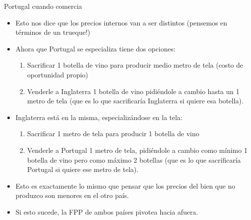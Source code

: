 \documentclass{beamer}
\begin{document}
\begin{frame}{Portugal cuando comercia}
    \begin{itemize}
        \item Esto nos dice que los precios internos van a ser distintos (pensemos en términos de un trueque!)
        \item Ahora que Portugal se especializa tiene dos opciones:
        \begin{enumerate}
            \item Sacrificar 1 botella de vino para producir medio metro de tela (costo de oportunidad propio)
            \item Venderle a Inglaterra 1 botella de vino pidiéndole a cambio hasta un 1 metro de tela (que es lo que sacrificaría Inglaterra si quiere esa botella).
        \end{enumerate}
        \item Inglaterra está en la misma, especializándose en la tela:
        \begin{enumerate}
            \item Sacrificar 1 metro de tela para producir 1 botella de vino
            \item Venderle a Portugal 1 metro de tela, pidiéndole a cambio como mínimo 1 botella de vino pero como máximo 2 botellas (que es lo que sacrificaría Portugal si quiere ese metro de tela).
        \end{enumerate}
        \item Esto es exactamente lo mismo que pensar que los precios del bien que no produzco son menores en el otro país.
        \item Si esto sucede, la FPP de ambos países pivotea hacia afuera. 
    \end{itemize}
\end{frame}
\end{document}
